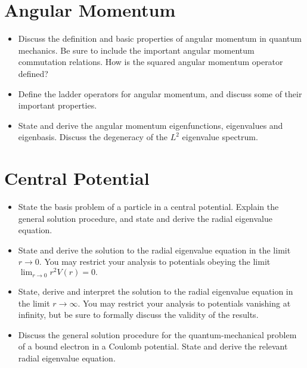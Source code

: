\section{Angular Momentum}

\begin{itemize}

    \item Discuss the definition and basic properties of angular momentum in quantum mechanics. Be sure to include the important angular momentum commutation relations. How is the squared angular momentum operator defined?

    \item Define the ladder operators for angular momentum, and discuss some of their important properties.

    \item State and derive the angular momentum eigenfunctions, eigenvalues and eigenbasis. Discuss the degeneracy of the $ L^{2} $ eigenvalue spectrum.

\end{itemize}

\section{Central Potential}

\begin{itemize}

    \item State the basis problem of a particle in a central potential. Explain the general solution procedure, and state and derive the radial eigenvalue equation.

    \item State and derive the solution to the radial eigenvalue equation in the limit $ r \to 0 $. You may restrict your analysis to potentials obeying the limit $ \lim_{r \to 0} r^{2}V(r) = 0. $

    \item State, derive and interpret the solution to the radial eigenvalue equation in the limit $ r \to \infty $. You may restrict your analysis to potentials vanishing at infinity, but be sure to formally discuss the validity of the results.

    \item Discuss the general solution procedure for the quantum-mechanical problem of a bound electron in a Coulomb potential. State and derive the relevant radial eigenvalue equation.

\end{itemize}

